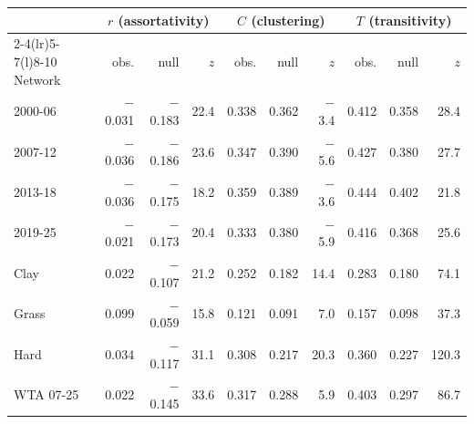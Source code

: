 \begin{tabular}{@{}lrrrrrrrrr@{}}
\toprule
 & \multicolumn{3}{c}{$r$ (assortativity)} & \multicolumn{3}{c}{$C$ (clustering)} & \multicolumn{3}{c}{$T$ (transitivity)} \\
\cmidrule(lr){2-4}\cmidrule(lr){5-7}\cmidrule(l){8-10}
Network & obs. & null & $z$ & obs. & null & $z$ & obs. & null & $z$ \\
\midrule
2000-06 & $-$0.031 & $-$0.183 & 22.4 & 0.338 & 0.362 & $-$3.4 & 0.412 & 0.358 & 28.4 \\
2007-12 & $-$0.036 & $-$0.186 & 23.6 & 0.347 & 0.390 & $-$5.6 & 0.427 & 0.380 & 27.7 \\
2013-18 & $-$0.036 & $-$0.175 & 18.2 & 0.359 & 0.389 & $-$3.6 & 0.444 & 0.402 & 21.8 \\
2019-25 & $-$0.021 & $-$0.173 & 20.4 & 0.333 & 0.380 & $-$5.9 & 0.416 & 0.368 & 25.6 \\
Clay & 0.022 & $-$0.107 & 21.2 & 0.252 & 0.182 & 14.4 & 0.283 & 0.180 & 74.1 \\
Grass & 0.099 & $-$0.059 & 15.8 & 0.121 & 0.091 & 7.0 & 0.157 & 0.098 & 37.3 \\
Hard & 0.034 & $-$0.117 & 31.1 & 0.308 & 0.217 & 20.3 & 0.360 & 0.227 & 120.3 \\
WTA 07-25 & 0.022 & $-$0.145 & 33.6 & 0.317 & 0.288 & 5.9 & 0.403 & 0.297 & 86.7 \\
\bottomrule
\end{tabular}
